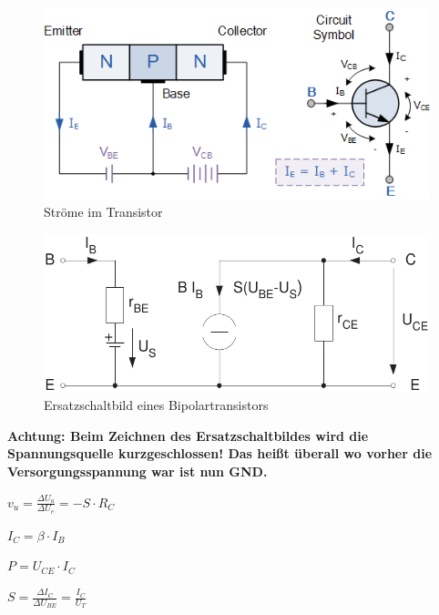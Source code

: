 \documentclass[a5paper, 12pt, twoside]{scrartcl}
\begin{document}
\begin{minipage}{.49\linewidth}
  \begin{figure}[H]
    \centering
    \includegraphics[width=\textwidth]{Transistor}
    \caption{Ströme im Transistor}
  \end{figure}
\end{minipage}\hfill\vline\hfill%
\begin{minipage}{.49\linewidth}
  \begin{figure}[H]
    \centering
    \includegraphics[width=\textwidth]{ESBTransistor}
    \caption{Ersatzschaltbild eines Bipolartransistors}
  \end{figure}
\end{minipage}

\textbf{Achtung: Beim Zeichnen des Ersatzschaltbildes wird die Spannungsquelle kurzgeschlossen! Das heißt überall wo vorher die Versorgungsspannung war ist nun GND.}

\dotfill\(v_u = \frac{\Delta U_a}{\Delta U_e} = -S \cdot R_C\)

\dotfill\(I_C = \beta \cdot I_B\)

\dotfill\(P = U_{CE} \cdot I_C\)

\dotfill\(S = \frac{\Delta I_C}{\Delta U_{BE}} = \frac{I_C}{U_T}\)
\end{document}
